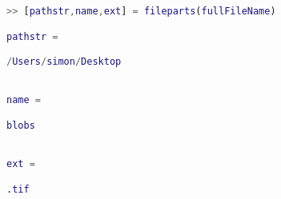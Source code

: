 \begin{lstlisting}[language=matlab]
>> [pathstr,name,ext] = fileparts(fullFileName)

pathstr =

/Users/simon/Desktop


name =

blobs


ext =

.tif

\end{lstlisting}